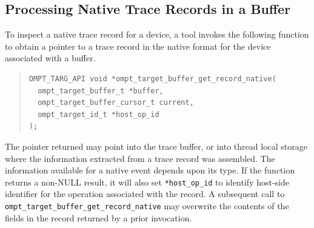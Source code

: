 \documentclass{article}
\begin{document}

\subsection{Processing Native Trace Records in a Buffer}
\label{sec:native-record-data}

To inspect a native trace record for a device, a tool invokes the following function to obtain a pointer to a trace record in the native format for the device associated with a buffer. \begin{quote}
\begin{verbatim}
OMPT_TARG_API void *ompt_target_buffer_get_record_native(
  ompt_target_buffer_t *buffer, 
  ompt_target_buffer_cursor_t current,
  ompt_target_id_t *host_op_id
);
\end{verbatim}
\end{quote}
The pointer returned  may point into the trace buffer, or into thread local storage where the information extracted from a trace record was assembled. The information available for a native event depends upon its type. If the function returns a non-NULL result, it will also set \verb|*host_op_id| to identify host-side identifier for the operation associated with the record.
A subsequent call to \verb|ompt_target_buffer_get_record_native| may overwrite the contents of the fields in the record returned by a prior invocation.
\end{document}
